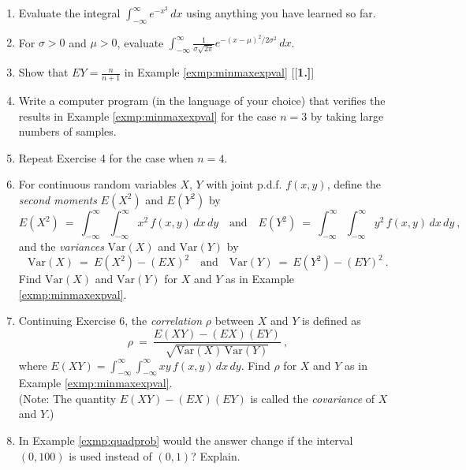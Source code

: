 \startexercises\label{sec3dot7}
\begin{enumerate}[\bfseries 1.]
 \item Evaluate the integral $\int_{-\infty}^{\infty} e^{-x^2}\,dx$ using anything you have learned so far.
 \item For $\sigma > 0$ and $\mu > 0$, evaluate $\int_{-\infty}^{\infty} \frac{1}{\sigma \sqrt{2\pi}}
  e^{-(x-\mu)^2 /2\sigma^2 } \,dx$.
 \item Show that $EY = \frac{n}{n+1}$ in Example \ref{exmp:minmaxexpval}
[{[\bfseries 1.]}]
 \item Write a computer program (in the language of your choice) that verifies the results in Example
 \ref{exmp:minmaxexpval} for the case $n=3$ by taking large numbers of samples.
 \item Repeat Exercise 4 for the case when $n=4$.
 \item For continuous random variables $X$, $Y$ with joint p.d.f. $f(x,y)$, define the \emph{second moments}
  $E(X^2 )$ and $E(Y^2 )$ by
  \begin{displaymath}
   E(X^2 ) ~=~ \int_{-\infty}^{\infty} \int_{-\infty}^{\infty} x^2 \,f(x,y)\,dx\,dy \quad\text{and}\quad
   E(Y^2 ) ~=~ \int_{-\infty}^{\infty} \int_{-\infty}^{\infty} y^2 \,f(x,y)\,dx\,dy ~,
  \end{displaymath}
  and the \emph{variances} $\text{Var}(X)$ and $\text{Var}(Y)$ by
  \begin{displaymath}
   \text{Var}(X) ~=~ E(X^2 ) - (EX)^2 \quad\text{and}\quad \text{Var}(Y) ~=~ E(Y^2 ) - (EY)^2 ~.
  \end{displaymath}
  Find $\text{Var}(X)$ and $\text{Var}(Y)$ for $X$ and $Y$ as in Example \ref{exmp:minmaxexpval}.
 \item Continuing Exercise 6, the \emph{correlation} $\rho$ between $X$ and $Y$ is defined as
  \begin{displaymath}
   \rho ~=~ \frac{E(XY) - (EX)(EY)}{\sqrt{\text{Var}(X)\,\text{Var}(Y)}} ~,
  \end{displaymath}
  where $E(XY) = \int_{-\infty}^{\infty} \int_{-\infty}^{\infty}xy \,f(x,y)\,dx\,dy$. Find $\rho$ for
  $X$ and $Y$ as in Example \ref{exmp:minmaxexpval}.\\(Note: The quantity $E(XY) - (EX)(EY)$ is called the
  \emph{covariance} of $X$ and $Y$.)
 \item In Example \ref{exmp:quadprob} would the answer change if the interval $(0,100)$ is used instead of
  $(0,1)$? Explain.
\end{enumerate}
